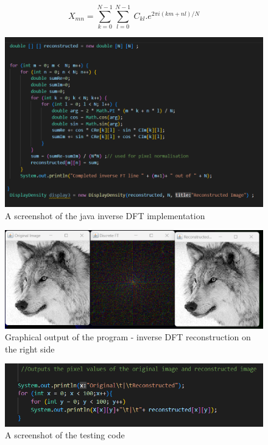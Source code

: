         \begin{center}
        \begin{equation}
            X_{mn} = \sum_{k=0}^{N-1} \sum_{l=0}^{N-1}\ C_{kl} . e^{2\pi i(km+nl)/N}
            \label{fig:equation-InverseFT}
        \end{equation}  
        \end{center}

        \begin{figure}[H]
            \centering
            \includegraphics[width=0.49\columnwidth]{Figures/Week 1/W1-SimpleFT-InverseDFT-Implementation.png}
            \caption{A screenshot of the java inverse DFT implementation}
            \label{fig:inverse-DFT-Code}
    \end{figure}
    
        \begin{figure}[H]
            \centering
            \includegraphics[width=0.49\columnwidth]{Figures/Week 1/W1-SimpleFT-InverseDFT-Graphical-Outputs.png}
            \caption{Graphical output of the program - inverse DFT reconstruction on the right side}
            \label{fig:inverse-DFT-Images-Output}
    \end{figure}
    
        \begin{figure}[H]
            \centering
            \includegraphics[width=0.49\columnwidth]{Figures/Week 1/W1-SimpleFT-InverseDFT-Test-1.0-code.png}
            \caption{A screenshot of the testing code}
            \label{fig:Testing-Code}
    \end{figure}
    
